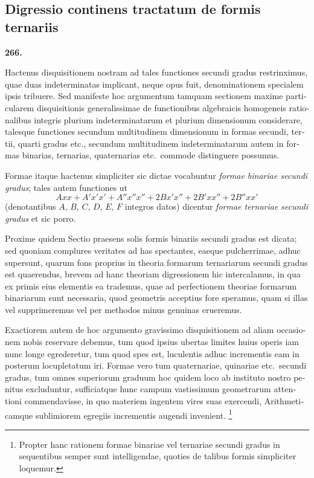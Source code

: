 \documentclass[12pt,a4paper]{article}
\theoremstyle{plain}
\theoremstyle{definition}
\theoremstyle{remark}
\begin{document}
\begin{otherlanguage}{latin}

\section*{Digressio continens tractatum de formis ternariis}

\textbf{266.}

Hactenus disquisitionem nostram ad tales functiones secundi gradus restrinximus, quae duas indeterminatas implicant, neque opus fuit, denominationem specialem ipsis tribuere. Sed manifeste hoc argumentum tamquam sectionem maxime particularem disquisitionis generalissimae de functionibus algebraicis homogeneis rationalibus integris plurium indeterminatarum et plurium dimensionum considerare, talesque functiones secundum multitudinem dimensionum in formas secundi, tertii, quarti gradus etc., secundum multitudinem indeterminatarum autem in formas binarias, ternarias, quaternarias etc.\ commode distinguere possumus.

Formae itaque hactenus simpliciter sic dictae vocabuntur \emph{formae binariae secundi gradus}; tales autem functiones ut
\[
Axx + A'x'x' + A''x''x'' + 2Bx'x'' + 2B'xx'' + 2B''xx'
\]
(denotantibus $A$, $B$, $C$, $D$, $E$, $F$ integros datos) dicentur \emph{formae ternariae secundi gradus} et sic porro.

Proxime quidem Sectio praesens solis formis binariis secundi gradus est dicata; sed quoniam complures veritates ad has spectantes, eaeque pulcherrimae, adhuc supersunt, quarum fons proprius in theoria formarum ternariarum secundi gradus est quaerendus, brevem ad hanc theoriam digressionem hic intercalamus, in qua ex primis eius elementis ea trademus, quae ad perfectionem theoriae formarum binariarum sunt necessaria, quod geometris acceptius fore speramus, quam si illas vel supprimeremus vel per methodos minus genuinas erueremus.

Exactiorem autem de hoc argumento gravissimo disquisitionem ad aliam occasionem nobis reservare debemus, tum quod ipsius ubertas limites huius operis iam nunc longe egrederetur, tum quod spes est, luculentis adhuc incrementis eam in posterum locupletatum iri. Formae vero tum quaternariae, quinariae etc.\ secundi gradus, tum omnes superiorum graduum hoc quidem loco ab instituto nostro penitus excluduntur, sufficiatque hunc campum vastissimum geometrarum attentioni commendavisse, in quo materiem ingentem vires suas exercendi, Arithmeticamque sublimiorem egregiis incrementis augendi invenient.
\footnote{Propter hanc rationem formae binariae vel ternariae secundi gradus in sequentibus semper sunt intelligendae, quoties de talibus formis simpliciter loquemur.}


\end{otherlanguage}
\end{document}
